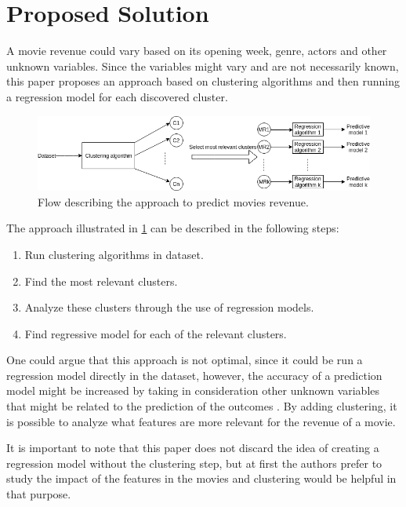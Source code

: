 \documentclass[10pt,twocolumn,letterpaper]{article}
\begin{document}
\section{Proposed Solution}
A movie revenue could vary based on its opening week, genre, actors and other unknown variables. Since the variables might vary and are not necessarily known, this paper proposes an approach based on clustering algorithms and then running a regression model for each discovered cluster. 

\begin{figure}[h!]
 \includegraphics[width=0.99\columnwidth]{pics/methodology.png}
 \caption{Flow describing the approach to predict movies revenue.\label{fig:methodology}}
\end{figure}

The approach illustrated in \ref{fig:methodology} can be described in the following steps:
\begin{enumerate}
  \item Run clustering algorithms in dataset.
  \item Find the most relevant clusters.
  \item Analyze these clusters through the use of regression models.
  \item Find regressive model for each of the relevant clusters.
\end{enumerate}

One could argue that this approach is not optimal, since it could be run a regression model directly in the dataset, however, the accuracy of a prediction model might be increased by taking in consideration other unknown variables that might be related to the prediction of the outcomes \cite{Inf_Front}. By adding clustering, it is possible to analyze what features are more relevant for the revenue of a movie.

It is important to note that this paper does not discard the idea of creating a regression model without the clustering step, but at first the authors prefer to study the impact of the features in the movies and clustering would be helpful in that purpose.


{\small


}
\end{document}
